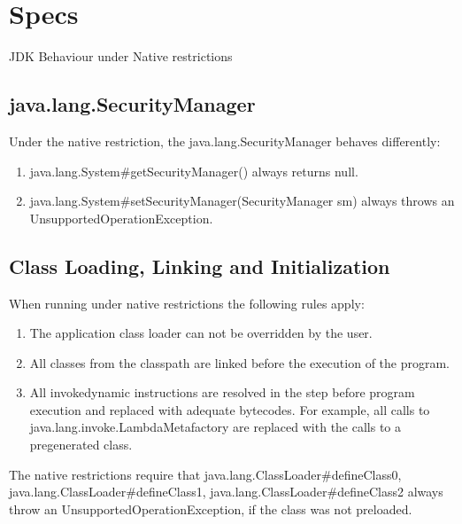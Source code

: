 \chapter{Specs}
JDK Behaviour under Native restrictions

\section{java.lang.SecurityManager}
Under the native restriction, the java.lang.SecurityManager behaves differently:
\begin{enumerate}
    \item java.lang.System\#getSecurityManager() always returns null.
    \item java.lang.System\#setSecurityManager(SecurityManager sm) always throws an UnsupportedOperationException. 
\end{enumerate}

\section{Class Loading, Linking and Initialization}
When running under native restrictions the following rules apply:
\begin{enumerate}
    \item The application class loader can not be overridden by the user.
    \item All classes from the classpath are linked before the execution of the program.
    \item All invokedynamic instructions are resolved in the step before program execution and replaced with adequate bytecodes. For example, all calls to java.lang.invoke.LambdaMetafactory are replaced with the calls to a pregenerated class.
\end{enumerate}

The native restrictions require that java.lang.ClassLoader\#defineClass0, java.lang.ClassLoader\#defineClass1, java.lang.ClassLoader\#defineClass2 always throw an UnsupportedOperationException, if the class was not preloaded. 


